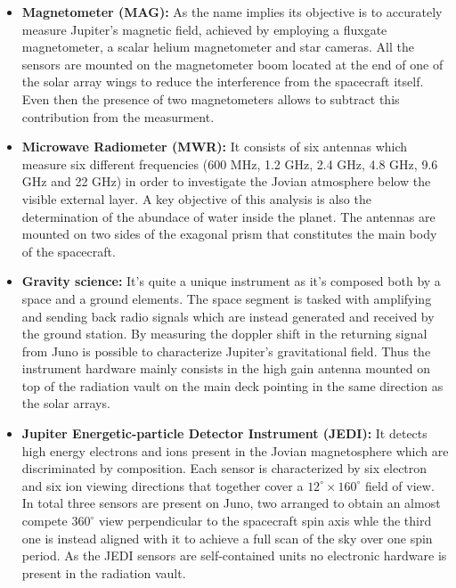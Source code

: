 \begin{itemize}
    \item \textbf{Magnetometer (MAG):} As the name implies its objective is to 
    accurately measure Jupiter's magnetic field, achieved by employing a fluxgate 
    magnetometer, a scalar helium magnetometer and star cameras. All the sensors 
    are mounted on the magnetometer boom located at the end of one of the solar 
    array wings to reduce the interference from the spacecraft itself. Even then the 
    presence of two magnetometers allows to subtract this contribution from the 
    measurment.
    
    \item \textbf{Microwave Radiometer (MWR):} It consists of six antennas which 
    measure six different frequencies (600 MHz, 1.2 GHz, 2.4 GHz, 4.8 GHz, 9.6 GHz 
    and 22 GHz) in order to investigate the Jovian atmosphere below the visible 
    external layer. A key objective of this analysis is also the determination of 
    the abundace of water inside the planet. The antennas are mounted on two sides 
    of the exagonal prism that constitutes the main body of the spacecraft.
    
    \item \textbf{Gravity science:} It's quite a unique instrument as it's composed
    both by a space and a ground elements. The space segment is tasked with 
    amplifying and sending back radio signals which are instead generated and 
    received by the ground station. By measuring the doppler shift in the returning
    signal from Juno is possible to characterize Jupiter's gravitational field. Thus
    the instrument hardware mainly consists in the high gain antenna mounted on top 
    of the radiation vault on the main deck pointing in the same direction as the 
    solar arrays.
    
    \item \textbf{Jupiter Energetic-particle Detector Instrument (JEDI):} It detects
    high energy electrons and ions present in the Jovian magnetosphere which are
    discriminated by composition. Each sensor is characterized by six electron and 
    six ion viewing directions that together cover a \(12^{\circ} \times 
    160^{\circ}\) field of view. In total three sensors are present on Juno, two
    arranged to obtain an almost compete \(360^{\circ}\) view perpendicular to 
    the spacecraft spin axis whle the third one is instead aligned with it to 
    achieve a full scan of the sky over one spin period. As the JEDI sensors are
    self-contained units no electronic hardware is present in the radiation vault.


\end{itemize}

